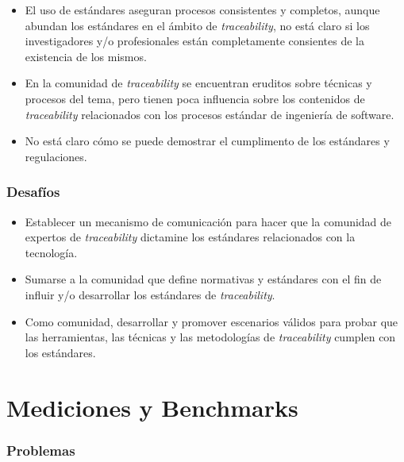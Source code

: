 \documentclass[a4paper,12pt,oneside,spanish]{book}
\begin{document}
\begin{itemize}[label={$\times$}]

\item El uso de estándares aseguran procesos consistentes y completos, aunque abundan los estándares en el ámbito de \textit{traceability}, no está claro si los investigadores y/o profesionales están completamente consientes de la existencia de los mismos.

\item En la comunidad de \textit{traceability} se encuentran eruditos sobre técnicas y procesos del tema, pero tienen poca influencia sobre los contenidos de \textit{traceability} relacionados con los procesos estándar de ingeniería de software.

\item No está claro cómo se puede demostrar el cumplimento de los estándares y regulaciones.

\end{itemize}

\subsubsection{Desafíos}

\begin{itemize}[label={\checkmark}]

\item Establecer un mecanismo de comunicación para hacer que la comunidad de expertos de \textit{traceability} dictamine los estándares relacionados con la tecnología.

\item Sumarse a la comunidad que define normativas y estándares con el fin de influir y/o desarrollar los estándares de \textit{traceability}.

\item Como comunidad, desarrollar y promover escenarios válidos para probar que las herramientas, las técnicas y las metodologías de \textit{traceability} cumplen con los estándares.

\end{itemize}


\section{Mediciones y Benchmarks}

\subsubsection{Problemas}
\end{document}
